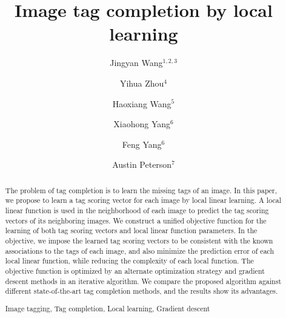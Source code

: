 \documentclass[runningheads,a4paper]{llncs}
\newcommand{\keywords}[1]{\par\addvspace\baselineskip
\noindent\keywordname\enspace\ignorespaces#1}
\begin{document}
\mainmatter  %

\title{Image tag completion by local learning}


\author{Jingyan Wang$^{1,2,3}$
\and
Yihua Zhou$^4$
\and
Haoxiang Wang$^5$
\and
Xiaohong Yang$^6$
\and
Feng Yang$^6$
\and
Austin Peterson$^7$
}



\maketitle


\begin{abstract}
The problem of tag completion is to learn the missing tags of an image. In this paper, we propose to learn a tag scoring vector for each image by local linear learning. A local linear function is used in the neighborhood of each image to predict the tag scoring vectors of its neighboring images. We construct a unified objective function for the learning of both tag scoring vectors and local linear function parameters. In the objective, we impose the learned tag scoring vectors to be consistent with the known associations to the tags of each image, and also minimize the prediction error of each local linear function, while reducing the complexity of each local function. The objective function is optimized by an alternate optimization strategy and gradient descent methods in an iterative algorithm. We compare the proposed algorithm against different state-of-the-art tag completion methods, and the results show its advantages.
\keywords{Image tagging,
Tag completion,
Local learning,
Gradient descent}
\end{abstract}
\end{document}
